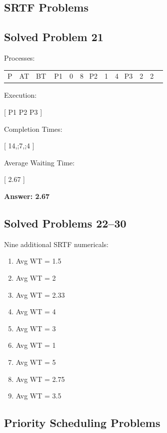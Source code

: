 \subsection{SRTF Problems}

\subsection{Solved Problem 21}

Processes:

\begin{center}
\begin{tabular}{|c|c|c|}
\hline
P & AT & BT \
\hline
P1 & 0 & 8 \
P2 & 1 & 4 \
P3 & 2 & 2 \
\hline
\end{tabular}
\end{center}

Execution:

[
P1 \rightarrow P2 \rightarrow P3
]

Completion Times:

[
14,;7,;4
]

Average Waiting Time:

[
2.67
]

\textbf{Answer: 2.67}

\subsection{Solved Problems 22--30}

Nine additional SRTF numericals:

\begin{enumerate}
\item Avg WT = 1.5
\item Avg WT = 2
\item Avg WT = 2.33
\item Avg WT = 4
\item Avg WT = 3
\item Avg WT = 1
\item Avg WT = 5
\item Avg WT = 2.75
\item Avg WT = 3.5
\end{enumerate}

\subsection{Priority Scheduling Problems}


